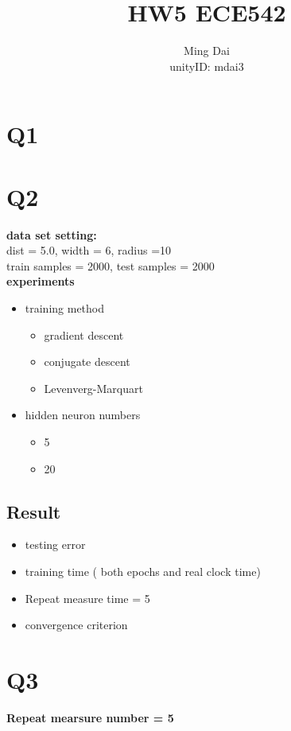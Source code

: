 \documentclass{article}
\title{HW5 ECE542}
\author{Ming Dai \\
	unityID: mdai3\\
}
\begin{document}
	\maketitle

  \newpage
  \section*{Q1}

	\newpage
  \section*{Q2}
	\textbf{data set setting:} \\
	dist = 5.0, width = 6, radius =10 \\
	train samples = 2000, test samples = 2000  \\


	\noindent \textbf{experiments}
		\begin{itemize}
			\item training method
				\begin{itemize}
					\item gradient descent
					\item conjugate descent
					\item Levenverg-Marquart
				\end{itemize}
			\item hidden neuron numbers
				\begin{itemize}
					\item 5
					\item 20
				\end{itemize}
		\end{itemize}

	\subsection*{Result}
		\begin{itemize}
			\item testing error
			\item training time ( both epochs and real clock time)
			\item Repeat measure time = 5
			\item convergence criterion
		\end{itemize}



	\newpage
  \section*{Q3}
		\textbf{Repeat mearsure number = 5}
\end{document}
